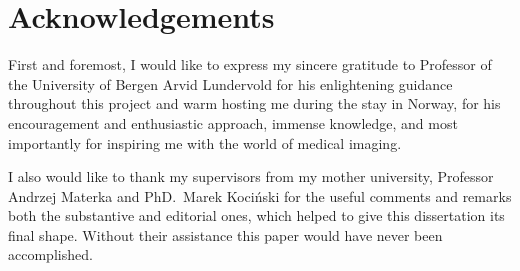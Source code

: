 \chapter*{Acknowledgements}

\thispagestyle{empty}

 \label{sec:acknowledgements}
	
First and foremost, I would like to express my sincere gratitude to Professor of the University of Bergen Arvid Lundervold for his enlightening guidance throughout this project and warm hosting me during the stay in Norway, for his encouragement and enthusiastic approach, immense knowledge, and most importantly for inspiring me with the world of medical imaging.

I also would like to thank my supervisors from my mother university, Professor Andrzej Materka and PhD.~Marek Kociński for the useful comments and remarks both the substantive and editorial ones, which helped to give this dissertation its final shape. Without their assistance this paper would have never been accomplished.

\newpage
\thispagestyle{empty}
\mbox{}
